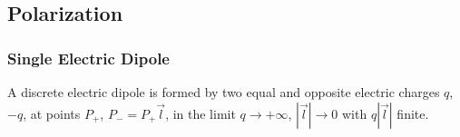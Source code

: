 \documentclass[letterpaper,10pt,english]{jupyterBook}
\begin{document}
\subsection{Polarization}
\label{\detokenize{ch/principles-matter-polarization:polarization}}\label{\detokenize{ch/principles-matter-polarization:classical-electromagnetism-media-polarization}}\label{\detokenize{ch/principles-matter-polarization::doc}}

\subsubsection{Single Electric Dipole}
\label{\detokenize{ch/principles-matter-polarization:single-electric-dipole}}
\sphinxAtStartPar
A discrete electric dipole is formed by two equal and opposite electric charges \(q\), \(-q\), at points \(P_+\), \(P_- = P_+ \vec{l}\), in the limit \(q \rightarrow +\infty\), \(|\vec{l}| \rightarrow 0\) with \(q |\vec{l}|\) finite.
\end{document}
